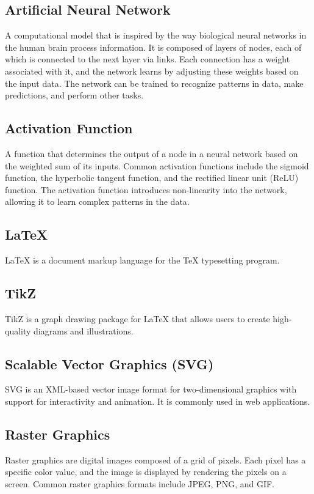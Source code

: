 \subsection*{Artificial Neural Network}
A computational model that is inspired by the way biological neural networks in the human brain process information. It is composed of layers of nodes, each of which is connected to the next layer via links. Each connection has a weight associated with it, and the network learns by adjusting these weights based on the input data. The network can be trained to recognize patterns in data, make predictions, and perform other tasks.

\subsection*{Activation Function}
A function that determines the output of a node in a neural network based on the weighted sum of its inputs. Common activation functions include the sigmoid function, the hyperbolic tangent function, and the rectified linear unit (ReLU) function. The activation function introduces non-linearity into the network, allowing it to learn complex patterns in the data.

\subsection*{\LaTeX{}}
\LaTeX{} is a document markup language for the TeX typesetting program.

\subsection*{TikZ}
TikZ is a graph drawing package for \LaTeX{} that allows users to create high-quality diagrams and illustrations.

\subsection*{Scalable Vector Graphics (SVG)}
SVG is an XML-based vector image format for two-dimensional graphics with support for interactivity and animation. It is commonly used in web applications.

\subsection*{Raster Graphics}
Raster graphics are digital images composed of a grid of pixels. Each pixel has a specific color value, and the image is displayed by rendering the pixels on a screen. Common raster graphics formats include JPEG, PNG, and GIF.

